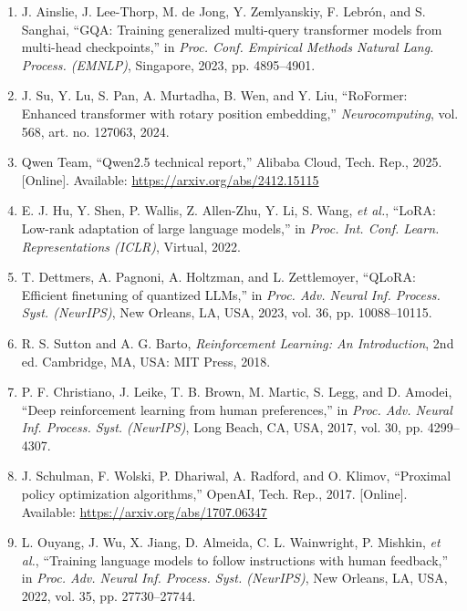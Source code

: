 \begin{enumerate}
\item\label{ref:ainslie2023}
  J. Ainslie, J. Lee-Thorp, M. de Jong, Y. Zemlyanskiy, F. Lebrón, and
  S. Sanghai, ``GQA: Training generalized multi-query transformer models
  from multi-head checkpoints,'' in \emph{Proc. Conf. Empirical Methods
  Natural Lang. Process. (EMNLP)}, Singapore, 2023, pp. 4895--4901.

\item\label{ref:su2024}
  J. Su, Y. Lu, S. Pan, A. Murtadha, B. Wen, and Y. Liu, ``RoFormer:
  Enhanced transformer with rotary position embedding,''
  \emph{Neurocomputing}, vol. 568, art. no. 127063, 2024.

\item\label{ref:qwen2025}
  Qwen Team, ``Qwen2.5 technical report,'' Alibaba Cloud, Tech. Rep., 2025.
  [Online]. Available: \url{https://arxiv.org/abs/2412.15115}

\item\label{ref:hu2022}
  E. J. Hu, Y. Shen, P. Wallis, Z. Allen-Zhu, Y. Li, S. Wang,
  \emph{et al.}, ``LoRA: Low-rank adaptation of large language models,'' in
  \emph{Proc. Int. Conf. Learn. Representations (ICLR)}, Virtual, 2022.

\item\label{ref:dettmers2023}
  T. Dettmers, A. Pagnoni, A. Holtzman, and L. Zettlemoyer, ``QLoRA:
  Efficient finetuning of quantized LLMs,'' in \emph{Proc. Adv. Neural Inf.
  Process. Syst. (NeurIPS)}, New Orleans, LA, USA, 2023, vol. 36,
  pp. 10088--10115.

\item\label{ref:sutton2018}
  R. S. Sutton and A. G. Barto, \emph{Reinforcement Learning: An
  Introduction}, 2nd ed. Cambridge, MA, USA: MIT Press, 2018.

\item\label{ref:christiano2017}
  P. F. Christiano, J. Leike, T. B. Brown, M. Martic, S. Legg, and
  D. Amodei, ``Deep reinforcement learning from human preferences,'' in
  \emph{Proc. Adv. Neural Inf. Process. Syst. (NeurIPS)}, Long Beach, CA,
  USA, 2017, vol. 30, pp. 4299--4307.

\item\label{ref:schulman2017}
  J. Schulman, F. Wolski, P. Dhariwal, A. Radford, and O. Klimov,
  ``Proximal policy optimization algorithms,'' OpenAI, Tech. Rep., 2017.
  [Online]. Available: \url{https://arxiv.org/abs/1707.06347}

\item\label{ref:ouyang2022}
  L. Ouyang, J. Wu, X. Jiang, D. Almeida, C. L. Wainwright, P. Mishkin,
  \emph{et al.}, ``Training language models to follow instructions with
  human feedback,'' in \emph{Proc. Adv. Neural Inf. Process. Syst.
  (NeurIPS)}, New Orleans, LA, USA, 2022, vol. 35, pp. 27730--27744.


\end{enumerate}
